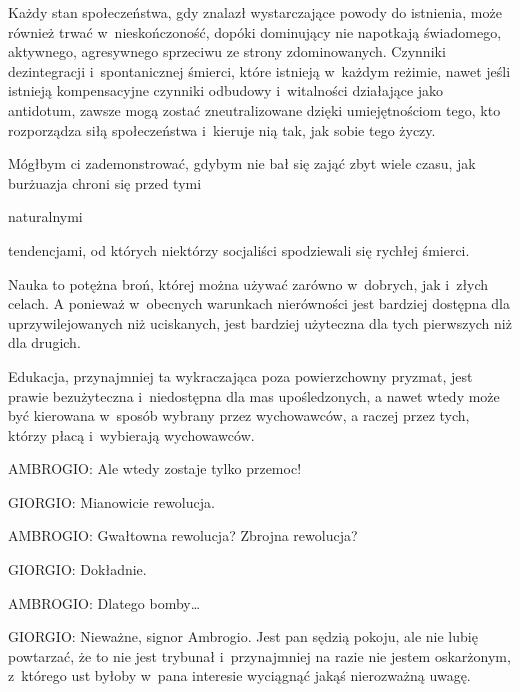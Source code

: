 \documentclass[oneside,polish,11pt,sfheadings]{mwbk}
\begin{document}
 
Każdy stan społeczeństwa, gdy znalazł wystarczające powody do istnienia, może również trwać w~nieskończoność, dopóki
dominujący nie napotkają świadomego, aktywnego, agresywnego sprzeciwu ze strony zdominowanych. Czynniki dezintegracji i~spontanicznej śmierci, które istnieją w~każdym reżimie, nawet jeśli istnieją kompensacyjne czynniki odbudowy i~witalności działające jako antidotum, zawsze mogą zostać zneutralizowane dzięki umiejętnościom tego, kto rozporządza
siłą społeczeństwa i~kieruje nią tak, jak sobie tego życzy. 

 
Mógłbym ci zademonstrować, gdybym nie bał się zająć zbyt wiele czasu, jak burżuazja chroni się przed tymi
\begin{itshape}naturalnymi \end{itshape} tendencjami, od których niektórzy socjaliści
spodziewali się rychłej śmierci. 

 
Nauka to potężna broń, której można używać zarówno w~dobrych, jak i~złych celach. A ponieważ w~obecnych warunkach
nierówności jest bardziej dostępna dla uprzywilejowanych niż uciskanych, jest bardziej użyteczna dla tych pierwszych
niż dla drugich. 

 
Edukacja, przynajmniej ta wykraczająca poza powierzchowny pryzmat, jest prawie bezużyteczna i~niedostępna dla mas
upośledzonych, a nawet wtedy może być kierowana w~sposób wybrany przez wychowawców, a raczej przez tych, którzy płacą i~wybierają wychowawców. 




 
\noindent AMBROGIO: Ale wtedy zostaje tylko przemoc! 




 
\noindent GIORGIO: Mianowicie rewolucja. 




 
\noindent AMBROGIO: Gwałtowna rewolucja? Zbrojna rewolucja? 




 
\noindent GIORGIO: Dokładnie. 




 
\noindent AMBROGIO: Dlatego bomby\ldots 




 
\noindent GIORGIO: Nieważne, signor Ambrogio. Jest pan sędzią pokoju, ale nie lubię powtarzać, że to nie jest trybunał i~przynajmniej na razie nie jestem oskarżonym, z~którego ust byłoby w~pana interesie wyciągnąć jakąś nierozważną
uwagę. 
\end{document}

